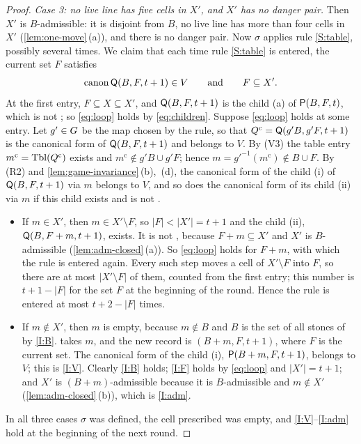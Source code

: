 \begin{proof}
\smallskip\noindent\emph{Case 3: no live line has five cells in $X'$, and $X'$ has no danger pair.} Then $X'$
is $B$-admissible: it is disjoint from $B$, no live line has more than four cells in $X'$
(\cref{lem:one-move}\,(a)), and there is no danger pair. Now $\sigma$ applies rule \ref{S:table}, possibly
several times. We claim that each time rule \ref{S:table} is entered, the current set $F$ satisfies
\begin{equation}\label{eq:loop}
  \operatorname{canon}\mathsf{Q}(B,F,t+1)\in V\qquad\text{and}\qquad F\subseteq X'.
\end{equation}
At the first entry, $F\subseteq X\subseteq X'$, and $\mathsf{Q}(B,F,t+1)$ is the child \textup{(a)} of
$\mathsf{P}(B,F,t)$, which is not \VOID; so \eqref{eq:loop} holds by \eqref{eq:children}. Suppose \eqref{eq:loop}
holds at some entry. Let $g'\in G$ be the map chosen by the rule, so that
$Q^{\mathrm c}=\mathsf{Q}(g'B,g'F,t+1)$ is the canonical form of $\mathsf{Q}(B,F,t+1)$ and belongs to $V$. By (V3) the
table entry $m^{\mathrm c}=\mathrm{Tbl}(Q^{\mathrm c})$ exists and $m^{\mathrm c}\notin g'B\cup g'F$; hence
$m=g'^{-1}(m^{\mathrm c})\notin B\cup F$. By (R2) and \cref{lem:game-invariance}\,(b),~(d), the canonical
form of the child \textup{(i)} of $\mathsf{Q}(B,F,t+1)$ via $m$ belongs to $V$, and so does the canonical form of
its child \textup{(ii)} via $m$ if this child exists and is not \VOID.
\begin{itemize}[leftmargin=2.2em]
\item If $m\in X'$, then $m\in X'\setminus F$, so $|F|<|X'|=t+1$ and the child \textup{(ii)},
  $\mathsf{Q}(B,F+m,t+1)$, exists. It is not \VOID, because $F+m\subseteq X'$ and $X'$ is $B$-admissible
  (\cref{lem:adm-closed}\,(a)). So \eqref{eq:loop} holds for $F+m$, with which the rule is entered again.
  Every such step moves a cell of $X'\setminus F$ into $F$, so there are at most $|X'\setminus F|$ of them,
  counted from the first entry; this number is $t+1-|F|$ for the set $F$ at the beginning of the round.
  Hence the rule is entered at most $t+2-|F|$ times.
\item If $m\notin X'$, then $m$ is empty, because $m\notin B$ and $B$ is the set of all stones of \Breaker{}
  by \ref{I:B}. \Breaker{} takes $m$, and the new record is $(B+m,F,t+1)$, where $F$ is the current set. The
  canonical form of the child \textup{(i)}, $\mathsf{P}(B+m,F,t+1)$, belongs to $V$; this is \ref{I:V}. Clearly
  \ref{I:B} holds; \ref{I:F} holds by \eqref{eq:loop} and $|X'|=t+1$; and $X'$ is $(B+m)$-admissible because
  it is $B$-admissible and $m\notin X'$ (\cref{lem:adm-closed}\,(b)), which is \ref{I:adm}.
\end{itemize}
In all three cases $\sigma$ was defined, the cell prescribed was empty, and \ref{I:V}--\ref{I:adm} hold at the
beginning of the next round.
\end{proof}

